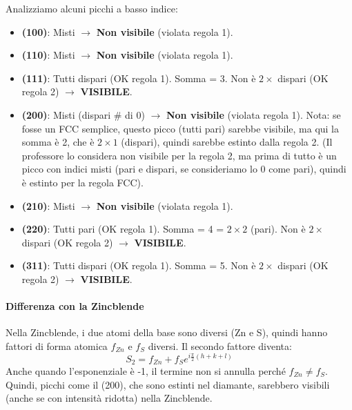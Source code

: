 Analizziamo alcuni picchi a basso indice:
\begin{itemize}
    \item \textbf{(100)}: Misti $\rightarrow$ \textbf{Non visibile} (violata regola 1).
    \item \textbf{(110)}: Misti $\rightarrow$ \textbf{Non visibile} (violata regola 1).
    \item \textbf{(111)}: Tutti dispari (OK regola 1). Somma = 3. Non è $2 \times$ dispari (OK regola 2) $\rightarrow$ \textbf{VISIBILE}.
    \item \textbf{(200)}: Misti (dispari \# di 0) $\rightarrow$ \textbf{Non visibile} (violata regola 1). Nota: se fosse un FCC semplice, questo picco (tutti pari) sarebbe visibile, ma qui la somma è 2, che è $2 \times 1$ (dispari), quindi sarebbe estinto dalla regola 2. (Il professore lo considera non visibile per la regola 2, ma prima di tutto è un picco con indici misti (pari e dispari, se consideriamo lo 0 come pari), quindi è estinto per la regola FCC).
    \item \textbf{(210)}: Misti $\rightarrow$ \textbf{Non visibile} (violata regola 1).
    \item \textbf{(220)}: Tutti pari (OK regola 1). Somma = 4 = $2 \times 2$ (pari). Non è $2 \times$ dispari (OK regola 2) $\rightarrow$ \textbf{VISIBILE}.
    \item \textbf{(311)}: Tutti dispari (OK regola 1). Somma = 5. Non è $2 \times$ dispari (OK regola 2) $\rightarrow$ \textbf{VISIBILE}.
\end{itemize}

\paragraph{Differenza con la Zincblende}
Nella Zincblende, i due atomi della base sono diversi (Zn e S), quindi hanno fattori di forma atomica $f_{Zn}$ e $f_S$ diversi. Il secondo fattore diventa:
$$ S_2 = f_{Zn} + f_S e^{i\frac{\pi}{2}(h+k+l)} $$
Anche quando l'esponenziale è -1, il termine non si annulla perché $f_{Zn} \neq f_S$. Quindi, picchi come il (200), che sono estinti nel diamante, sarebbero visibili (anche se con intensità ridotta) nella Zincblende.
